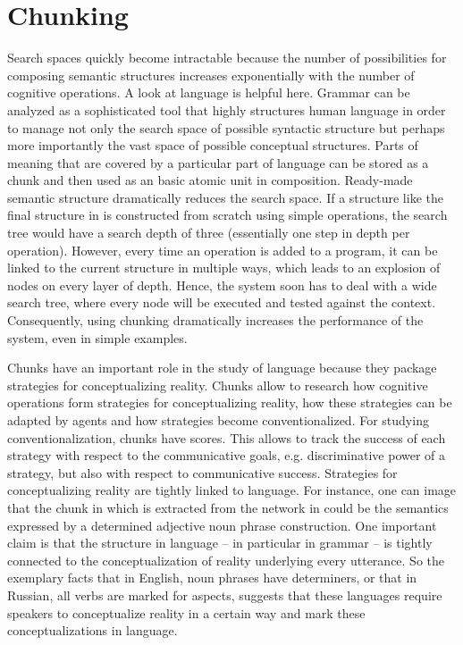 \section{Chunking}
Search spaces quickly become intractable because the number of 
possibilities for composing semantic structures increases exponentially 
with the number of cognitive operations. A look at language
is helpful here. Grammar can be analyzed as a sophisticated
tool that highly structures human language in order to manage not only
the search space of possible syntactic structure \citep{steels2006dampen} but
perhaps more importantly the vast space of possible conceptual
structures. Parts of meaning that are covered by a particular
part of language can be stored as a chunk and 
then used as an basic atomic unit in composition.
Ready-made semantic structure dramatically reduces the search space. If a structure like
the final structure in  is
constructed from scratch using simple operations, the search tree
would have a search depth of three (essentially one step in depth per
operation). However, every time an operation is added to a program, it
can be linked to the current structure in multiple ways, which leads
to an explosion of nodes on every layer of depth. Hence, the system
soon has to deal with a wide search tree, where every node will be 
executed and tested against the context. Consequently, using chunking 
dramatically increases the performance of the system, even in simple examples.

Chunks have an important role in the study of language because
they package strategies for conceptualizing reality.
Chunks allow to research how cognitive operations
form strategies for conceptualizing reality, how these
strategies can be adapted by agents and how strategies
become conventionalized. For studying conventionalization, 
chunks have scores. This allows to track the success of each strategy with
respect to the communicative goals, e.g. discriminative power
of a strategy, but also with respect to communicative success. 
Strategies for conceptualizing reality are tightly linked to 
language. For instance, one can image that the
chunk in  which 
is extracted from the network in 
could be the semantics expressed by a determined adjective
noun phrase construction. One important claim is that the structure in language --
in particular in grammar -- is tightly connected to the conceptualization
of reality underlying every utterance. So the exemplary facts that in English,
noun phrases have determiners, or that in Russian, all
verbs are marked for aspects, suggests that these languages 
require speakers to conceptualize reality in a certain way and
mark these conceptualizations in language. 

